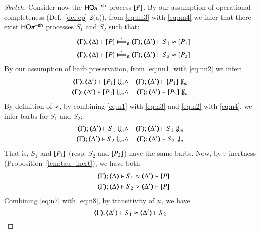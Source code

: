\begin{proof}[Sketch]
Consider now the $\mathsf{HO}\pi^{\mathsf{-sh}}$ process $[\!\![P]\!\!]$. %
By our assumption of operational completeness 
(Def.~\ref{def:ep}-2(a)), 
from \eqref{eq:nn3} with \eqref{eq:nn4}
we infer that
there exist $\mathsf{HO}\pi^{\mathsf{-sh}}$ processes $S_1$ and $S_2$ such that:
\begin{eqnarray}
& & \shwtytra{\mapt{\Gamma}}{\tau}{\mapt{\Delta}}{\map{P}}{\mapt{\Delta'}}{S_1 \wb \map{P_1}} \label{eq:n1} \\
& & \shwtytra{\mapt{\Gamma}}{\tau}{\mapt{\Delta}}{\map{P}}{\mapt{\Delta'}}{S_2 \wb \map{P_2}} \label{eq:n2}
\end{eqnarray}
By our assumption of barb preservation, 
from \eqref{eq:nn1} with \eqref{eq:nn2}
we infer: 
\begin{eqnarray}
\mapt{\Gamma}; \mapt{\Delta'} \proves \map{P_1} \Barb{n} & \land & 
\mapt{\Gamma}; \mapt{\Delta'} \proves \map{P_1} \nBarb{m} \label{eq:n3} \\
\mapt{\Gamma}; \mapt{\Delta'} \proves \map{P_2} \Barb{m} & \land & 
\mapt{\Gamma}; \mapt{\Delta'} \proves \map{P_2} \nBarb{n} \label{eq:n4}
\end{eqnarray}
By definition of $\approx$, 
by combining 
\eqref{eq:n1} with \eqref{eq:n3}
and
\eqref{eq:n2} with \eqref{eq:n4}, we infer barbs for $S_1$ and $S_2$:
\begin{eqnarray}
\mapt{\Gamma}; \mapt{\Delta'} \proves S_1 \Barb{n} & \land & 
\mapt{\Gamma}; \mapt{\Delta'} \proves S_1 \nBarb{m} \label{eq:n5} \\
\mapt{\Gamma}; \mapt{\Delta'} \proves S_2 \Barb{m} & \land & 
\mapt{\Gamma}; \mapt{\Delta'} \proves S_2 \nBarb{n} \label{eq:n6}
\end{eqnarray}
That is, $S_1$ and $[\!\![P_1]\!\!]$ 
(resp. $S_2$ and $[\!\![P_2]\!\!]$)
 have the same barbs.
Now, by $\tau$-inertness (Proposition~\ref{lem:tau_inert}), we have both 
\begin{eqnarray}
& & \horel{\mapt{\Gamma}}{\mapt{\Delta}}{S_1}{\wb}{\mapt{\Delta'}}{\map{P}} \label{eq:n7} \\
& & \horel{\mapt{\Gamma}}{\mapt{\Delta}}{S_2}{\wb}{\mapt{\Delta'}}{\map{P}} \label{eq:n8}
\end{eqnarray}
Combining \eqref{eq:n7} with \eqref{eq:n8}, by transitivity of $\approx$,
we have 
\begin{equation}
\horel{\mapt{\Gamma}}{\mapt{\Delta'}}{S_1}{\wb}{\mapt{\Delta'}}{S_2} \label{eq:n9}

\end{equation}
\end{proof}
